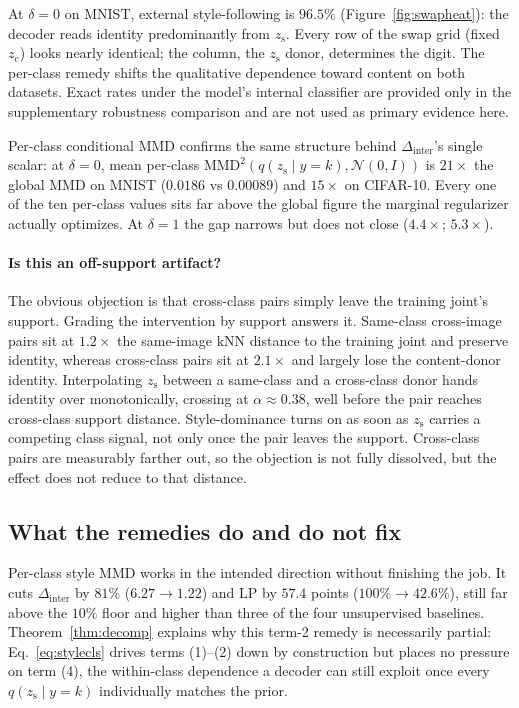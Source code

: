 \documentclass[letterpaper]{article}
\newcommand{\zc}{z_{\mathrm{c}}}
\newcommand{\zs}{z_{\mathrm{s}}}
\newcommand{\MMD}{\mathrm{MMD}}
\newcommand{\Dinter}{\Delta_{\mathrm{inter}}}
\begin{document}
At $\delta{=}0$ on MNIST, external style-following is $96.5\%$
(Figure~\ref{fig:swapheat}): the decoder reads identity predominantly from
$\zs$. Every row of the swap grid (fixed $\zc$) looks nearly identical; the
column, the $\zs$ donor, determines the digit. The per-class remedy shifts
the qualitative dependence toward content on both datasets. Exact rates
under the model's internal classifier are provided only in the supplementary
robustness comparison and are not used as primary evidence here.

Per-class conditional MMD confirms the same structure behind $\Dinter$'s
single scalar: at $\delta{=}0$, mean per-class $\MMD^2(q(\zs\mid
y{=}k),\mathcal N(0,I))$ is $21\times$ the global MMD on MNIST ($0.0186$ vs
$0.00089$) and $15\times$ on CIFAR-10. Every one of the ten per-class values
sits far above the global figure the marginal regularizer actually optimizes.
At $\delta{=}1$ the gap narrows but does not close ($4.4\times$; $5.3\times$).

\paragraph{Is this an off-support artifact?}
The obvious objection is that cross-class pairs simply leave the training
joint's support. Grading the intervention by support answers it. Same-class
cross-image pairs sit at $1.2\times$ the same-image kNN distance to the
training joint and preserve identity, whereas cross-class pairs sit at
$2.1\times$ and largely lose the content-donor identity. Interpolating
$\zs$ between a same-class and a cross-class donor hands identity over
monotonically, crossing at $\alpha\approx0.38$, well before the pair reaches
cross-class support distance. Style-dominance turns on as soon as $\zs$
carries a competing class signal, not only once the pair leaves the support.
Cross-class pairs are measurably farther out, so the objection is not fully
dissolved, but the effect does not reduce to that distance.

\subsection{What the remedies do and do not fix}
\label{sec:exp-remedy}

Per-class style MMD works in the intended direction without finishing the
job. It cuts $\Dinter$ by $81\%$ ($6.27\to1.22$) and LP by $57.4$ points
($100\%\to42.6\%$), still far above the $10\%$ floor and higher than three of
the four unsupervised baselines. Theorem~\ref{thm:decomp} explains why this
term-2 remedy is necessarily partial: Eq.~\ref{eq:stylecls} drives terms
(1)--(2) down by construction but places no pressure on term (4), the
within-class dependence a decoder can still exploit once every
$q(\zs\mid y{=}k)$ individually matches the prior.
\end{document}

